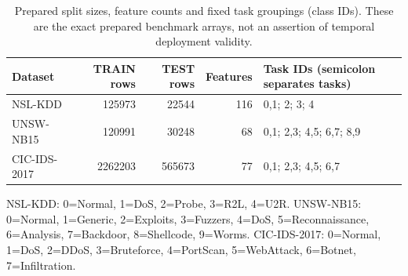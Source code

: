 \begin{table}[t]
\centering\scriptsize
\setlength{\tabcolsep}{3.8pt}
\caption{Prepared split sizes, feature counts and fixed task groupings (class IDs). These are the exact prepared benchmark arrays, not an assertion of temporal deployment validity.}\label{tab:dataset-details}
\begin{tabular}{lrrrl}
\toprule
Dataset & TRAIN rows & TEST rows & Features & Task IDs (semicolon separates tasks) \\
\midrule
NSL-KDD & 125973 & 22544 & 116 & 0,1; 2; 3; 4 \\
UNSW-NB15 & 120991 & 30248 & 68 & 0,1; 2,3; 4,5; 6,7; 8,9 \\
CIC-IDS-2017 & 2262203 & 565673 & 77 & 0,1; 2,3; 4,5; 6,7 \\
\bottomrule
\end{tabular}
\par\vspace{2pt}\begin{minipage}{.98\linewidth}\footnotesize NSL-KDD: 0=Normal, 1=DoS, 2=Probe, 3=R2L, 4=U2R. UNSW-NB15: 0=Normal, 1=Generic, 2=Exploits, 3=Fuzzers, 4=DoS, 5=Reconnaissance, 6=Analysis, 7=Backdoor, 8=Shellcode, 9=Worms. CIC-IDS-2017: 0=Normal, 1=DoS, 2=DDoS, 3=Bruteforce, 4=PortScan, 5=WebAttack, 6=Botnet, 7=Infiltration.\end{minipage}
\end{table}
